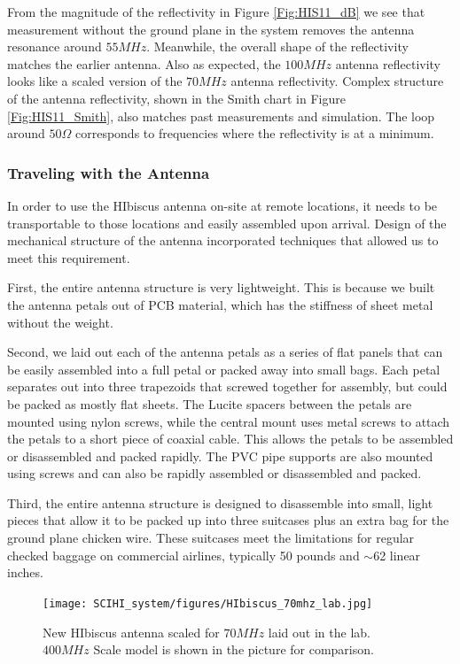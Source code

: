 From the magnitude of the reflectivity in Figure \ref{Fig:HIS11_dB} we see that measurement without the ground plane in the system removes the antenna resonance around $55 MHz$. Meanwhile, the overall shape of the reflectivity matches the earlier antenna. Also as expected, the $100 MHz$ antenna reflectivity looks like a scaled version of the $70 MHz$ antenna reflectivity. Complex structure of the antenna reflectivity, shown in the Smith chart in Figure \ref{Fig:HIS11_Smith}, also matches past measurements and simulation. The loop around $50 \Omega$ corresponds to frequencies where the reflectivity is at a minimum. 

\subsubsection{Traveling with the Antenna}

In order to use the HIbiscus antenna on-site at remote locations, it needs to be transportable to those locations and easily assembled upon arrival. Design of the mechanical structure of the antenna incorporated techniques that allowed us to meet this requirement. 

First, the entire antenna structure is very lightweight. This is because we built the antenna petals out of PCB material, which has the stiffness of sheet metal without the weight.  

Second, we laid out each of the antenna petals as a series of flat panels that can be easily assembled into a full petal or packed away into small bags. Each petal separates out into three trapezoids that screwed together for assembly, but could be packed as mostly flat sheets. The Lucite spacers between the petals are mounted using nylon screws, while the central mount uses metal screws to attach the petals to a short piece of coaxial cable. This allows the petals to be assembled or disassembled and packed rapidly. The PVC pipe supports are also mounted using screws and can also be rapidly assembled or disassembled and packed. 

Third, the entire antenna structure is designed to disassemble into small, light pieces that allow it to be packed up into three suitcases plus an extra bag for the ground plane chicken wire. These suitcases meet the limitations for regular checked baggage on commercial airlines, typically 50 pounds and $\sim$62 linear inches. 
\begin{figure}[htb]
\begin{center}
\texttt{[image: SCIHI\_system/figures/HIbiscus\_70mhz\_lab.jpg]}
\caption{New HIbiscus antenna scaled for $70 MHz$ laid out in the lab. $400 MHz$ Scale model is shown in the picture for comparison.}
\label{Fig:hibiscus_70}
\end{center}
\end{figure}

